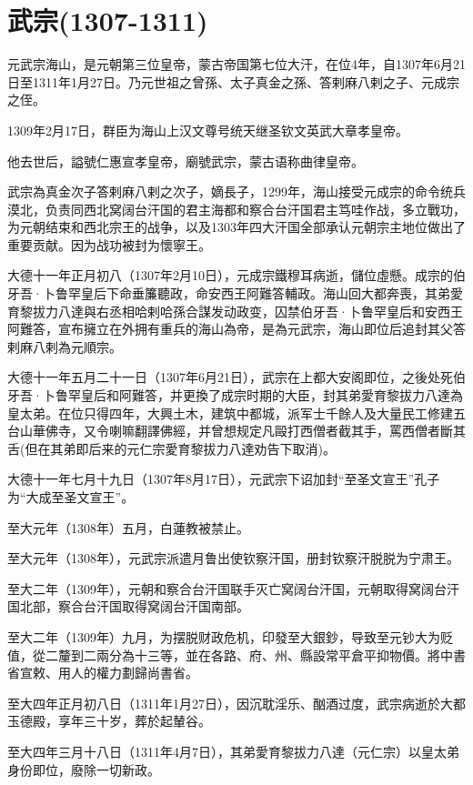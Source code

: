 
\section{武宗\tiny(1307-1311)}

元武宗海山，是元朝第三位皇帝，蒙古帝国第七位大汗，在位4年，自1307年6月21日至1311年1月27日。乃元世祖之曾孫、太子真金之孫、答剌麻八剌之子、元成宗之侄。

1309年2月17日，群臣为海山上汉文尊号统天继圣钦文英武大章孝皇帝。

他去世后，謚號仁惠宣孝皇帝，廟號武宗，蒙古语称曲律皇帝。

武宗為真金次子答剌麻八剌之次子，嫡長子，1299年，海山接受元成宗的命令统兵漠北，负责同西北窝阔台汗国的君主海都和察合台汗国君主笃哇作战，多立戰功，为元朝结束和西北宗王的战争，以及1303年四大汗国全部承认元朝宗主地位做出了重要贡献。因为战功被封为懷寧王。

大德十一年正月初八（1307年2月10日），元成宗鐵穆耳病逝，儲位虛懸。成宗的伯牙吾·卜鲁罕皇后下命垂簾聽政，命安西王阿難答輔政。海山回大都奔喪，其弟愛育黎拔力八達與右丞相哈剌哈孫合謀发动政变，囚禁伯牙吾·卜鲁罕皇后和安西王阿難答，宣布擁立在外拥有重兵的海山為帝，是為元武宗，海山即位后追封其父答剌麻八剌為元順宗。

大德十一年五月二十一日（1307年6月21日），武宗在上都大安阁即位，之後处死伯牙吾·卜鲁罕皇后和阿難答，并更換了成宗时期的大臣，封其弟愛育黎拔力八達為皇太弟。在位只得四年，大興土木，建筑中都城，派军士千餘人及大量民工修建五台山華佛寺，又令喇嘛翻譯佛經，并曾想规定凡毆打西僧者截其手，罵西僧者斷其舌(但在其弟即后来的元仁宗愛育黎拔力八達劝告下取消)。

大德十一年七月十九日（1307年8月17日），元武宗下诏加封“至圣文宣王”孔子为“大成至圣文宣王”。

至大元年（1308年）五月，白蓮教被禁止。

至大元年（1308年），元武宗派遣月鲁出使钦察汗国，册封钦察汗脱脱为宁肃王。

至大二年（1309年），元朝和察合台汗国联手灭亡窝阔台汗国，元朝取得窝阔台汗国北部，察合台汗国取得窝阔台汗国南部。

至大二年（1309年）九月，为摆脱财政危机，印發至大銀鈔，导致至元钞大为贬值，從二釐到二兩分為十三等，並在各路、府、州、縣設常平倉平抑物價。將中書省宣敕、用人的權力劃歸尚書省。

至大四年正月初八日（1311年1月27日），因沉耽淫乐、酗酒过度，武宗病逝於大都玉德殿，享年三十岁，葬於起輦谷。

至大四年三月十八日（1311年4月7日），其弟愛育黎拔力八達（元仁宗）以皇太弟身份即位，廢除一切新政。

